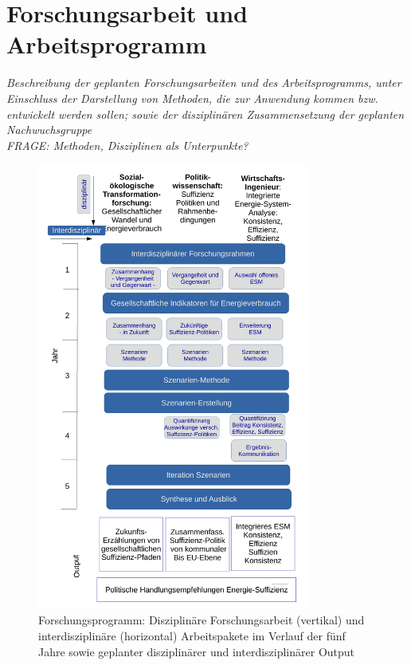 \documentclass[a4paper,11pt,twoside]{scrartcl}
\begin{document}
\section{Forschungsarbeit und Arbeitsprogramm}
\textit{Beschreibung der geplanten Forschungsarbeiten und des Arbeitsprogramms, unter Einschluss der Darstellung von Methoden, die zur Anwendung kommen bzw. entwickelt werden sollen; sowie der disziplinären Zusammensetzung der geplanten Nachwuchsgruppe}\\
\textit{FRAGE: Methoden, Disziplinen als Unterpunkte?}\\


\begin{figure}[!h]
    \centering
    \includegraphics[width=0.8\textwidth]{figures/Forschungsarbeit.pdf}
    \caption{Forschungsprogramm: Disziplinäre Forschungsarbeit (vertikal) und  interdisziplinäre (horizontal) Arbeitspakete im Verlauf der fünf Jahre sowie geplanter disziplinärer und interdisziplinärer Output}
    \label{fig:forschungsprogramm}
\end{figure}
\end{document}
